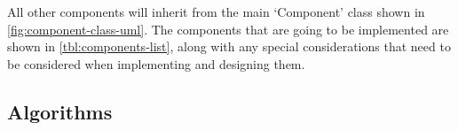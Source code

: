         All other components will inherit from the main `Component' class shown in \autoref{fig:component-class-uml}. 
        The components that are going to be implemented are shown in \autoref{tbl:components-list}, along with any special considerations that need to be considered when implementing and designing them. 


    \subsection{Algorithms}



